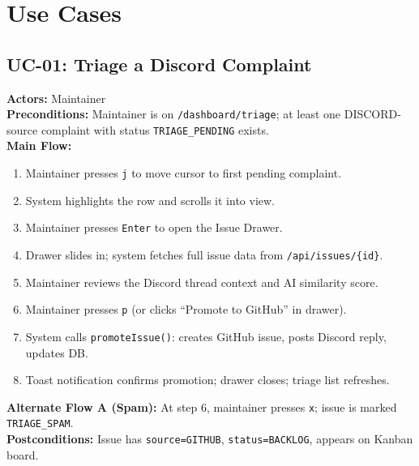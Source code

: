\documentclass[12pt,a4paper]{report}
\begin{document}
\section{Use Cases}

\subsection{UC-01: Triage a Discord Complaint}
\begin{tcolorbox}[colback=gray!5,colframe=accent,title=UC-01 --- Triage Discord Complaint]
\textbf{Actors:} Maintainer \\
\textbf{Preconditions:} Maintainer is on \texttt{/dashboard/triage}; at least one DISCORD-source complaint with status \texttt{TRIAGE\_PENDING} exists. \\
\textbf{Main Flow:}
\begin{enumerate}
  \item Maintainer presses \texttt{j} to move cursor to first pending complaint.
  \item System highlights the row and scrolls it into view.
  \item Maintainer presses \texttt{Enter} to open the Issue Drawer.
  \item Drawer slides in; system fetches full issue data from \texttt{/api/issues/\{id\}}.
  \item Maintainer reviews the Discord thread context and AI similarity score.
  \item Maintainer presses \texttt{p} (or clicks ``Promote to GitHub'' in drawer).
  \item System calls \texttt{promoteIssue()}: creates GitHub issue, posts Discord reply, updates DB.
  \item Toast notification confirms promotion; drawer closes; triage list refreshes.
\end{enumerate}
\textbf{Alternate Flow A (Spam):} At step 6, maintainer presses \texttt{x}; issue is marked \texttt{TRIAGE\_SPAM}. \\
\textbf{Postconditions:} Issue has \texttt{source=GITHUB}, \texttt{status=BACKLOG}, appears on Kanban board.
\end{tcolorbox}
\end{document}
